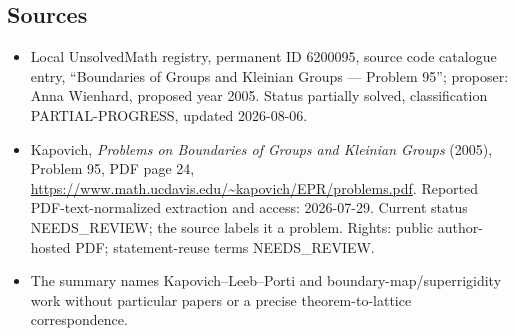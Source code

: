 \documentclass[11pt]{article}
\begin{document}
\subsection{Sources}
\begin{itemize}
\item Local UnsolvedMath registry, permanent ID 6200095, source code catalogue entry, ``Boundaries of Groups and Kleinian Groups --- Problem 95''; proposer: Anna Wienhard, proposed year 2005. Status partially solved, classification PARTIAL-PROGRESS, updated 2026-08-06.
\item Kapovich, \emph{Problems on Boundaries of Groups and Kleinian Groups} (2005), Problem 95, PDF page 24, \url{https://www.math.ucdavis.edu/~kapovich/EPR/problems.pdf}. Reported PDF-text-normalized extraction and access: 2026-07-29. Current status NEEDS\_REVIEW; the source labels it a problem. Rights: public author-hosted PDF; statement-reuse terms NEEDS\_REVIEW.
\item The summary names Kapovich--Leeb--Porti and boundary-map/superrigidity work without particular papers or a precise theorem-to-lattice correspondence.
\end{itemize}
\end{document}
